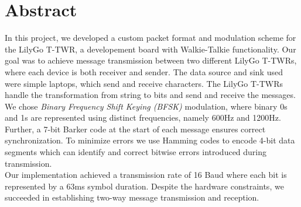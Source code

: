 \chapter{Abstract}
In this project, we developed a custom packet format and modulation scheme for the LilyGo T-TWR, a developement board with Walkie-Talkie functionality. Our goal was to achieve message transmission between two different LilyGo T-TWRs, where each device is both receiver and sender. The data source and sink used were simple laptops, which send and receive characters. The LilyGo T-TWRs handle the transformation from string to bits and send and receive the messages. %
\\
We chose \textit{Binary Frequency Shift Keying (BFSK)} modulation, where binary 0s and 1s are represented using distinct frequencies, namely 600Hz and 1200Hz. Further, a 7-bit Barker code at the start of each message ensures correct synchronization. To minimize errors we use Hamming codes to encode 4-bit data segments which can identify and correct bitwise errors introduced during transmission. 
\\
Our implementation achieved a transmission rate of 16 Baud where each bit is represented by a 63ms symbol duration. Despite the hardware constraints, we succeeded in establishing two-way message transmission and reception.